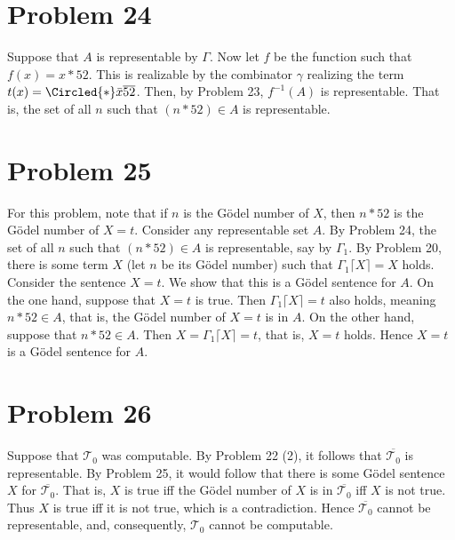 \documentclass{article}
\theoremstyle{definition}
\begin{document}
\section*{Problem 24}
Suppose that $A$ is representable by $\Gamma$. Now let $f$ be the function such that $f(x)=x*52$. This is realizable by the combinator $\gamma$ realizing the term 
$t(x)=\Circled{*}\bar{x}\overline{52}$. Then, by Problem 23, $f^{-1}(A)$ is representable. That is, the set of all $n$ such that $(n*52)\in A$ is representable.

\section*{Problem 25}
For this problem, note that if $n$ is the Gödel number of $X$, then $n*52$ is the Gödel number of $X=t$. 
Consider any representable set $A$. By Problem 24, the set of all $n$ such that $(n*52)\in A$ is representable, say by $\Gamma_1$. By Problem 20, there is some term $X$ 
(let $n$ be its Gödel number)
such that $\Gamma_1\bigl \lceil X\bigr \rceil=X$ holds. Consider the sentence $X=t$. We show that this is a Gödel sentence for $A$. On the one hand, suppose that $X=t$ is true. Then
$\Gamma_1\bigl \lceil X\bigr \rceil =t$ also holds, meaning $n*52\in A$, that is, the Gödel number of $X=t$ is in $A$. On the other hand, suppose that $n*52\in A$. Then 
$X=\Gamma_1\bigl \lceil X\bigr \rceil =t$, that is, $X=t$ holds. Hence $X=t$ is a Gödel sentence for $A$.  

\section*{Problem 26}
Suppose that $\mathcal{T}_0$ was computable. By Problem 22 (2), it follows that $\overline{\mathcal{T}_0}$ is representable. By Problem 25, it would follow that there is some Gödel sentence $X$ for 
$\overline{\mathcal{T}_0}$. That is, $X$ is true iff the Gödel number of $X$ is in $\overline{\mathcal{T}_0}$ iff $X$ is not true. 
Thus $X$ is true iff it is not true, which is a contradiction. Hence $\overline{\mathcal{T}_0}$ cannot be 
representable, and, consequently, $\mathcal{T}_0$ cannot be computable.
\end{document}
